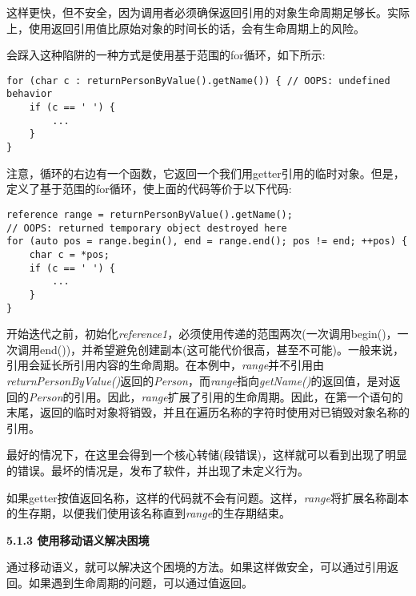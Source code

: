 这样更快，但不安全，因为调用者必须确保返回引用的对象生命周期足够长。实际上，使用返回引用值比原始对象的时间长的话，会有生命周期上的风险。\par

会踩入这种陷阱的一种方式是使用基于范围的for循环，如下所示:\par

\begin{lstlisting}[caption={}]
for (char c : returnPersonByValue().getName()) { // OOPS: undefined behavior
	if (c == ' ') {
		...
	}
}
\end{lstlisting}

注意，循环的右边有一个函数，它返回一个我们用getter引用的临时对象。但是，定义了基于范围的for循环，使上面的代码等价于以下代码:\par

\begin{lstlisting}[caption={}]
reference range = returnPersonByValue().getName();
// OOPS: returned temporary object destroyed here
for (auto pos = range.begin(), end = range.end(); pos != end; ++pos) {
	char c = *pos;
	if (c == ' ') {
		...
	}
}
\end{lstlisting}

开始迭代之前，初始化\textit{reference1}，必须使用传递的范围两次(一次调用begin()，一次调用end())，并希望避免创建副本(这可能代价很高，甚至不可能)。一般来说，引用会延长所引用内容的生命周期。在本例中，\textit{range}并不引用由\textit{returnPersonByValue()}返回的\textit{Person}，而\textit{range}指向\textit{getName()}的返回值，是对返回的\textit{Person}的引用。因此，\textit{range}扩展了引用的生命周期。因此，在第一个语句的末尾，返回的临时对象将销毁，并且在遍历名称的字符时使用对已销毁对象名称的引用。\par

最好的情况下，在这里会得到一个核心转储(段错误)，这样就可以看到出现了明显的错误。最坏的情况是，发布了软件，并出现了未定义行为。\par

如果getter按值返回名称，这样的代码就不会有问题。这样，\textit{range}将扩展名称副本的生存期，以便我们使用该名称直到\textit{range}的生存期结束。\par

\hspace*{\fill} \par %
\textbf{5.1.3 使用移动语义解决困境}

通过移动语义，就可以解决这个困境的方法。如果这样做安全，可以通过引用返回。如果遇到生命周期的问题，可以通过值返回。\par

